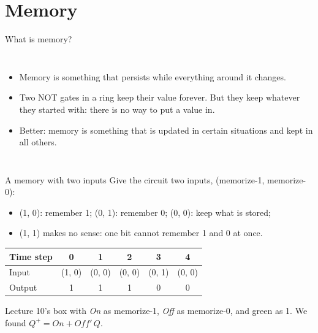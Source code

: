 \documentclass[10pt]{wosm-slides}
\begin{document}
\section{Memory}

\begin{frame}{What is memory?}
  \begin{columns}[c, totalwidth=\textwidth]
      \centering
      \par\medskip
      \begin{itemize}
        \item Memory is something that persists while everything around it changes.
        \item Two NOT gates in a ring keep their value forever. But they keep whatever
          they started with: there is no way to put a value in.
        \item Better: memory is something that is \alert{updated} in certain
          situations and \alert{kept} in all others.
      \end{itemize}
  \end{columns}
\end{frame}

\begin{frame}{A memory with two inputs}
  Give the circuit two inputs, (memorize-1, memorize-0):
  \begin{itemize}
    \item (1, 0): remember 1; \quad (0, 1): remember 0; \quad (0, 0): keep what is
      stored;
    \item (1, 1) makes no sense: one bit cannot remember 1 and 0 at once.
  \end{itemize}

  \medskip
  \begin{center}
    \begin{tabular}{@{}l|ccccc@{}}
      Time step & 0 & 1 & 2 & 3 & 4 \\
      \midrule
      Input & (1, 0) & (0, 0) & (0, 0) & (0, 1) & (0, 0) \\
      Output & 1 & 1 & 1 & 0 & 0 \\
    \end{tabular}
  \end{center}

  \medskip
  \begin{remark}
    Lecture 10's box with \emph{On} as memorize-1, \emph{Off} as memorize-0, and green
    as 1. We found $Q^{+} = \mathit{On} + \mathit{Off}'\,Q$.
  \end{remark}
\end{frame}
\end{document}
